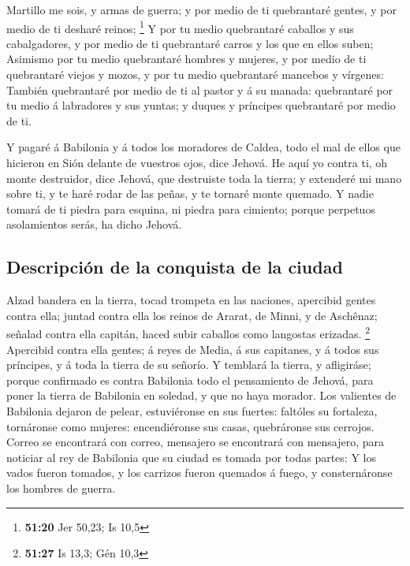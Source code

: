  Martillo me sois, y armas de guerra; y por medio de ti
quebrantaré gentes, y por medio de ti desharé reinos; \footnote{\textbf{51:20}
  Jer 50,23; Is 10,5}  Y por tu medio quebrantaré caballos
y sus cabalgadores, y por medio de ti quebrantaré carros y los que en
ellos suben;  Asimismo por tu medio quebrantaré hombres y
mujeres, y por medio de ti quebrantaré viejos y mozos, y por tu medio
quebrantaré mancebos y vírgenes:  También quebrantaré por
medio de ti al pastor y á su manada: quebrantaré por tu medio á
labradores y sus yuntas; y duques y príncipes quebrantaré por medio de
ti.

 Y pagaré á Babilonia y á todos los moradores de Caldea,
todo el mal de ellos que hicieron en Sión delante de vuestros ojos, dice
Jehová.  He aquí yo contra ti, oh monte destruidor, dice
Jehová, que destruiste toda la tierra; y extenderé mi mano sobre ti, y
te haré rodar de las peñas, y te tornaré monte quemado.  Y
nadie tomará de ti piedra para esquina, ni piedra para cimiento; porque
perpetuos asolamientos serás, ha dicho Jehová.

\hypertarget{descripciuxf3n-de-la-conquista-de-la-ciudad}{%
\subsection{Descripción de la conquista de la
ciudad}\label{descripciuxf3n-de-la-conquista-de-la-ciudad}}

 Alzad bandera en la tierra, tocad trompeta en las
naciones, apercibid gentes contra ella; juntad contra ella los reinos de
Ararat, de Minni, y de Aschênaz; señalad contra ella capitán, haced
subir caballos como langostas erizadas. \footnote{\textbf{51:27} Is
  13,3; Gén 10,3}  Apercibid contra ella gentes; á reyes de
Media, á sus capitanes, y á todos sus príncipes, y á toda la tierra de
su señorío.  Y temblará la tierra, y afligiráse; porque
confirmado es contra Babilonia todo el pensamiento de Jehová, para poner
la tierra de Babilonia en soledad, y que no haya morador. 
Los valientes de Babilonia dejaron de pelear, estuviéronse en sus
fuertes: faltóles su fortaleza, tornáronse como mujeres: encendiéronse
sus casas, quebráronse sus cerrojos.  Correo se encontrará
con correo, mensajero se encontrará con mensajero, para noticiar al rey
de Babilonia que su ciudad es tomada por todas partes:  Y
los vados fueron tomados, y los carrizos fueron quemados á fuego, y
consternáronse los hombres de guerra.

